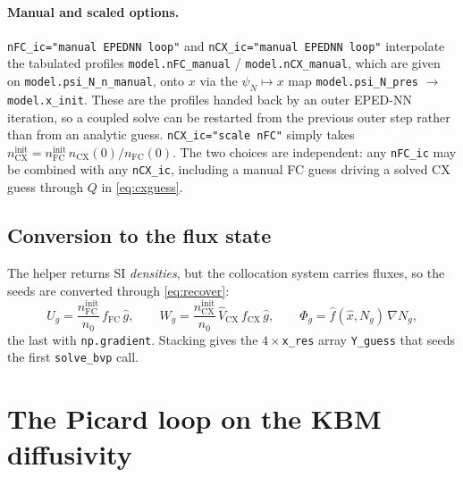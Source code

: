 \documentclass[11pt]{article}
\newcommand{\hx}{\hat{x}}
\newcommand{\hg}{\hat{g}}
\newcommand{\hV}{\hat{V}}
\newcommand{\hf}{\hat{f}}
\newcommand{\code}[1]{\texttt{#1}}
\begin{document}
\paragraph{Manual and scaled options.}
\code{nFC\_ic="manual EPEDNN loop"} and
\code{nCX\_ic="manual EPEDNN loop"} interpolate the tabulated profiles
\code{model.nFC\_manual} / \code{model.nCX\_manual}, which are given on
\code{model.psi\_N\_n\_manual}, onto $x$ via the
$\psi_N \mapsto x$ map \code{model.psi\_N\_pres} $\to$
\code{model.x\_init}.  These are the profiles handed back by an outer
EPED-NN iteration, so a coupled solve can be restarted from the
previous outer step rather than from an analytic guess.
\code{nCX\_ic="scale nFC"} simply takes
$n_{\mathrm{CX}}^{\mathrm{init}} = n_{\mathrm{FC}}^{\mathrm{init}}\,
n_{\mathrm{CX}}(0)/n_{\mathrm{FC}}(0)$.
The two choices are independent: any \code{nFC\_ic} may be combined with
any \code{nCX\_ic}, including a manual FC guess driving a solved CX
guess through $Q$ in \eqref{eq:cxguess}.

\subsection{Conversion to the flux state}

The helper returns SI \emph{densities}, but the collocation system
carries fluxes, so the seeds are converted through \eqref{eq:recover}:
\begin{equation}
  U_g = \frac{n_{\mathrm{FC}}^{\mathrm{init}}}{n_0}\,
        f_{\mathrm{FC}}\,\hg,
  \qquad
  W_g = \frac{n_{\mathrm{CX}}^{\mathrm{init}}}{n_0}\,
        \hV_{\mathrm{CX}}\,f_{\mathrm{CX}}\,\hg,
  \qquad
  \Phi_g = \hf(\hx, N_g)\,\nabla N_g,
\end{equation}
the last with \code{np.gradient}.  Stacking gives the
$4 \times$\code{x\_res} array \code{Y\_guess} that seeds the first
\code{solve\_bvp} call.

\section{The Picard loop on the KBM diffusivity}
\label{sec:picard}
\end{document}
